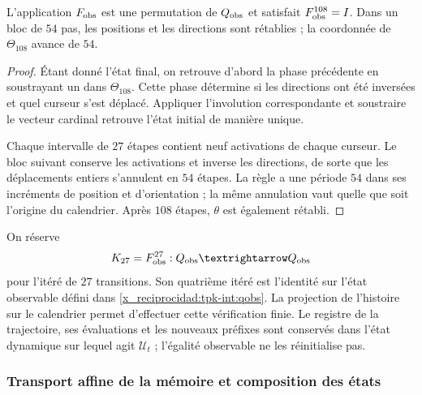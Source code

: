 \begin{proposition}
\label{x_reciprocidad:tpk-int:periodo}
L'application \(F_{\rm obs}\) est une permutation de \(\mathcal Q_{\rm obs}\) et satisfait \(F_{\rm obs}^{108}=I\). Dans un bloc de \(54\) pas, les positions et les directions sont rétablies ; la coordonnée de \(\Theta_{108}\) avance de \(54\).
\end{proposition}
\begin{proof}
Étant donné l'état final, on retrouve d'abord la phase précédente en soustrayant un
dans \(\Theta_{108}\). Cette phase détermine si les
directions ont été inversées et quel curseur s'est déplacé. Appliquer l'involution correspondante
et soustraire le vecteur cardinal retrouve l'état initial de manière unique.

Chaque intervalle de \(27\) étapes contient neuf activations de chaque
curseur. Le bloc suivant conserve les activations et inverse les
directions, de sorte que les déplacements entiers s'annulent en
\(54\) étapes. La règle a une période \(54\) dans ses incréments de
position et d'orientation ; la même annulation vaut quelle que soit l'origine
du calendrier. Après \(108\) étapes, \(\theta\) est également rétabli.
\end{proof}

On réserve
\[
 \mathcal K_{27}=F_{\rm obs}^{27}:
 \mathcal Q_{\rm obs}\longrightarrow\mathcal Q_{\rm obs}
\]
pour l'itéré de \(27\) transitions. Son quatrième itéré est l'identité sur l'état observable défini dans \eqref{x_reciprocidad:tpk-int:qobs}. La projection de l'histoire sur le calendrier permet d'effectuer cette vérification finie. Le registre de la trajectoire, ses évaluations et les nouveaux préfixes sont conservés dans l'état dynamique sur lequel agit \(\mathcal U_t\) ; l'égalité observable ne les réinitialise pas.

\subsubsection{Transport affine de la mémoire et composition des états}
\label{x_reciprocidad:tpk-int:memoria}

